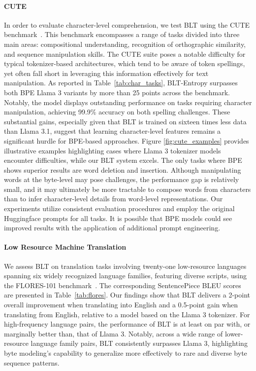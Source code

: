 \paragraph{CUTE}
In order to evaluate character-level comprehension, we test {\textsc BLT} using the CUTE benchmark~\citep{edman2024cute}. This benchmark encompasses a range of tasks divided into three main areas: compositional understanding, recognition of orthographic similarity, and sequence manipulation skills. The CUTE suite poses a notable difficulty for typical tokenizer-based architectures, which tend to be aware of token spellings, yet often fall short in leveraging this information effectively for text manipulation. As reported in Table~\ref{tab:char_tasks}, {\textsc BLT}-Entropy surpasses both BPE Llama 3 variants by more than 25 points across the benchmark. Notably, the model displays outstanding performance on tasks requiring character manipulation, achieving 99.9\% accuracy on both spelling challenges. These substantial gains, especially given that {\textsc BLT} is trained on sixteen times less data than Llama 3.1, suggest that learning character-level features remains a significant hurdle for BPE-based approaches. Figure \ref{fig:cute_examples} provides illustrative examples highlighting cases where Llama 3 tokenizer models encounter difficulties, while our {\textsc BLT} system excels. The only tasks where BPE shows superior results are word deletion and insertion. Although manipulating words at the byte-level may pose challenges, the performance gap is relatively small, and it may ultimately be more tractable to compose words from characters than to infer character-level details from word-level representations. Our experiments utilize consistent evaluation procedures and employ the original Huggingface prompts for all tasks. It is possible that BPE models could see improved results with the application of additional prompt engineering.

\paragraph{Low Resource Machine Translation} We assess {\textsc BLT} on translation tasks involving twenty-one low-resource languages spanning six widely recognized language families, featuring diverse scripts, using the FLORES-101 benchmark~\citep{goyal2022flores}. The corresponding SentencePiece BLEU scores are presented in Table~\ref{tab:flores}. Our findings show that {\textsc BLT} delivers a 2-point overall improvement when translating into English and a 0.5-point gain when translating from English, relative to a model based on the Llama 3 tokenizer. For high-frequency language pairs, the performance of {\textsc BLT} is at least on par with, or marginally better than, that of Llama 3. Notably, across a wide range of lower-resource language family pairs, {\textsc BLT} consistently surpasses Llama 3, highlighting byte modeling's capability to generalize more effectively to rare and diverse byte sequence patterns.

